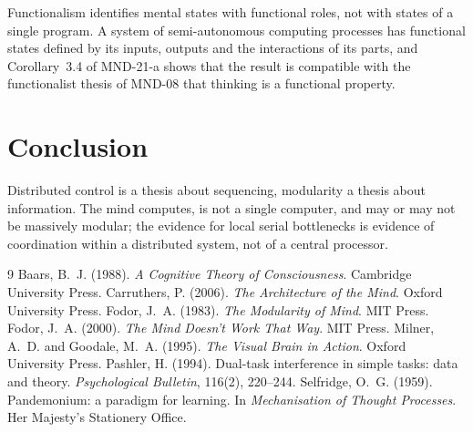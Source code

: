 \documentclass{situationist-preprint}
\begin{document}
\begin{reply}
Functionalism identifies mental states with functional roles, not with states of a single program. A system of semi-autonomous computing processes has functional states defined by its inputs, outputs and the interactions of its parts, and Corollary~3.4 of MND-21-a shows that the result is compatible with the functionalist thesis of MND-08 that thinking is a functional property.
\end{reply}

\section{Conclusion}

Distributed control is a thesis about sequencing, modularity a thesis about information. The mind computes, is not a single computer, and may or may not be massively modular; the evidence for local serial bottlenecks is evidence of coordination within a distributed system, not of a central processor.

\begin{thebibliography}{9}\small
{} Baars, B.~J. (1988). \emph{A Cognitive Theory of Consciousness}. Cambridge University Press.
 Carruthers, P. (2006). \emph{The Architecture of the Mind}. Oxford University Press.
 Fodor, J.~A. (1983). \emph{The Modularity of Mind}. MIT Press.
 Fodor, J.~A. (2000). \emph{The Mind Doesn't Work That Way}. MIT Press.
 Milner, A.~D. and Goodale, M.~A. (1995). \emph{The Visual Brain in Action}. Oxford University Press.
 Pashler, H. (1994). Dual-task interference in simple tasks: data and theory. \emph{Psychological Bulletin}, 116(2), 220--244.
 Selfridge, O.~G. (1959). Pandemonium: a paradigm for learning. In \emph{Mechanisation of Thought Processes}. Her Majesty's Stationery Office.
\end{thebibliography}
\end{document}
